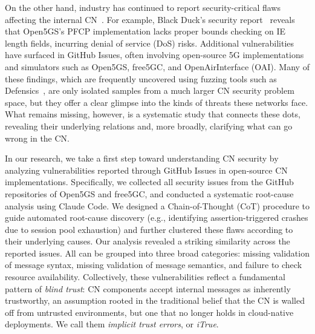 On the other hand, industry has continued to report security-critical flaws affecting the internal CN~\cite{blackduck2022open5gs, nccgroup2021open5gs}. For example, Black Duck's security report~\cite{blackduck2022open5gs} reveals that Open5GS's PFCP implementation lacks proper bounds checking on IE length fields, incurring denial of service (DoS) risks. Additional vulnerabilities have surfaced in GitHub Issues, often involving open-source 5G implementations and simulators such as Open5GS, free5GC, and OpenAirInterface (OAI). Many of these findings, which are frequently uncovered using fuzzing tools such as Defensics~\cite{blackduckfuzzing}, are only isolated samples from a much larger CN security problem space, but they offer a clear glimpse into the kinds of threats these networks face. What remains missing, however, is a systematic study that connects these dots, revealing their underlying relations and, more broadly, clarifying what can go wrong in the CN.

In our research, we take a first step toward understanding CN security by analyzing vulnerabilities reported through GitHub Issues in open-source CN implementations. 
Specifically, we collected all security issues from the GitHub repositories of Open5GS and free5GC, and conducted a systematic root-cause analysis using Claude Code. We designed a Chain-of-Thought (CoT) procedure to guide automated root-cause discovery (e.g., identifying assertion-triggered crashes due to session pool exhaustion) and further clustered these flaws according to their underlying causes. Our analysis revealed a striking similarity across the reported issues. All can be grouped into three broad categories: missing validation of message syntax, missing validation of message semantics, and failure to check resource availability. Collectively, these vulnerabilities reflect a fundamental pattern of \textit{blind trust}: CN components accept internal messages as inherently trustworthy, an assumption rooted in the traditional belief that the CN is walled off from untrusted environments, but one that no longer holds in cloud-native deployments. We call them \textit{implicit trust errors}, or \textit{iTrue}. 


